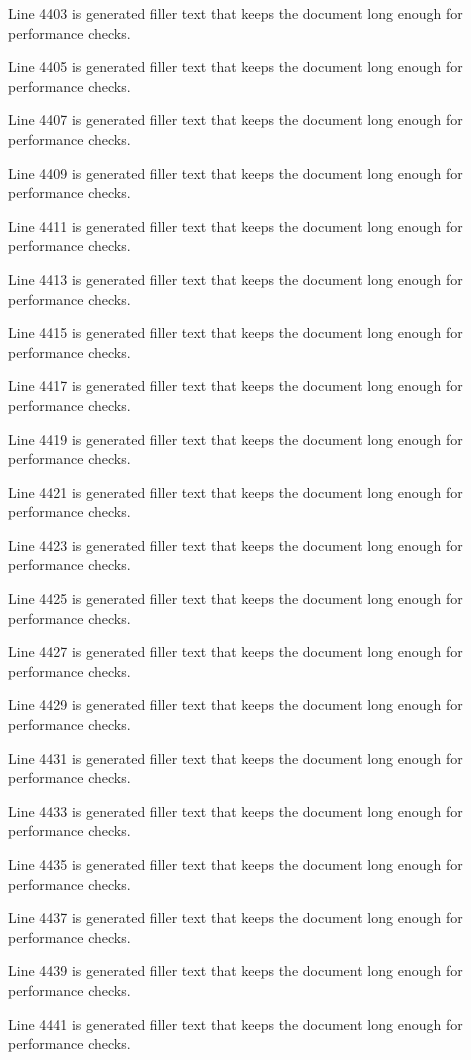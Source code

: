 Line 4403 is generated filler text that keeps the document long enough for performance checks.

Line 4405 is generated filler text that keeps the document long enough for performance checks.

Line 4407 is generated filler text that keeps the document long enough for performance checks.

Line 4409 is generated filler text that keeps the document long enough for performance checks.

Line 4411 is generated filler text that keeps the document long enough for performance checks.

Line 4413 is generated filler text that keeps the document long enough for performance checks.

Line 4415 is generated filler text that keeps the document long enough for performance checks.

Line 4417 is generated filler text that keeps the document long enough for performance checks.

Line 4419 is generated filler text that keeps the document long enough for performance checks.

Line 4421 is generated filler text that keeps the document long enough for performance checks.

Line 4423 is generated filler text that keeps the document long enough for performance checks.

Line 4425 is generated filler text that keeps the document long enough for performance checks.

Line 4427 is generated filler text that keeps the document long enough for performance checks.

Line 4429 is generated filler text that keeps the document long enough for performance checks.

Line 4431 is generated filler text that keeps the document long enough for performance checks.

Line 4433 is generated filler text that keeps the document long enough for performance checks.

Line 4435 is generated filler text that keeps the document long enough for performance checks.

Line 4437 is generated filler text that keeps the document long enough for performance checks.

Line 4439 is generated filler text that keeps the document long enough for performance checks.

Line 4441 is generated filler text that keeps the document long enough for performance checks.

